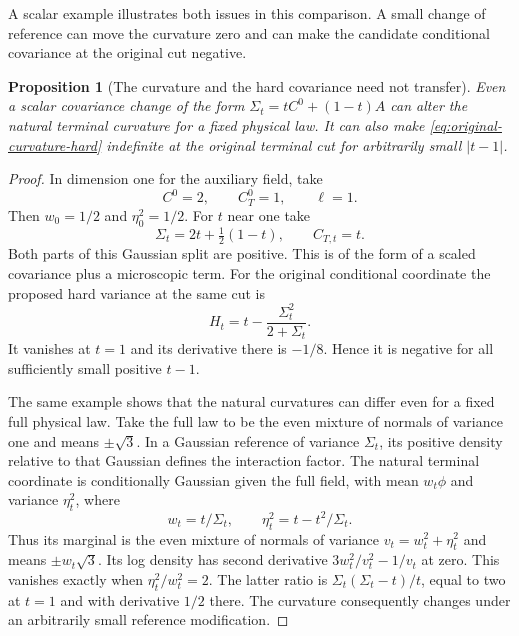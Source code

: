 \documentclass[11pt]{article}
\newtheorem{proposition}[theorem]{Proposition}
\theoremstyle{definition}
\begin{document}
A scalar example illustrates both issues in this comparison. A
small change of reference can move the curvature zero and can
make the candidate conditional covariance at the original cut
negative.

\begin{proposition}[The curvature and the hard covariance need not transfer]
\label{prop:curvature-reference-obstruction}
Even a scalar covariance change of the form
\(\Sigma_t=tC^0+(1-t)A\) can alter the natural terminal
curvature for a fixed physical law. It can also make
\eqref{eq:original-curvature-hard} indefinite at the original
terminal cut for arbitrarily small \(|t-1|\).
\end{proposition}

\begin{proof}
In dimension one for the auxiliary field, take
\begin{equation}
 C^0=2,\qquad C_T^0=1,\qquad \ell=1.
\end{equation}
Then \(w_0=1/2\) and \(\eta_0^2=1/2\). For \(t\) near one
take
\begin{equation}
 \Sigma_t=2t+\tfrac12(1-t),\qquad C_{T,t}=t .
\end{equation}
Both parts of this Gaussian split are positive. This is of
the form of a scaled covariance plus a microscopic term.
For the original conditional coordinate the proposed hard
variance at the same cut is
\begin{equation}
 H_t=t-\frac{\Sigma_t^2}{2+\Sigma_t}.
\end{equation}
It vanishes at \(t=1\) and its derivative there is
\(-1/8\). Hence it is negative for all sufficiently small
positive \(t-1\).

The same example shows that the natural curvatures can differ
even for a fixed full physical law. Take the full law to be
the even mixture of normals of variance one and means
\(\pm\sqrt3\). In a Gaussian reference of variance
\(\Sigma_t\), its positive density relative to that Gaussian
defines the interaction factor. The natural terminal
coordinate is conditionally Gaussian given the full field,
with mean \(w_t\phi\) and variance \(\eta_t^2\), where
\begin{equation}
 w_t=t/\Sigma_t,\qquad
 \eta_t^2=t-t^2/\Sigma_t.
\end{equation}
Thus its marginal is the even mixture of normals of
variance \(v_t=w_t^2+\eta_t^2\) and means
\(\pm w_t\sqrt3\). Its log density has second derivative
\(3w_t^2/v_t^2-1/v_t\) at zero. This vanishes exactly when
\(\eta_t^2/w_t^2=2\). The latter ratio is
\(\Sigma_t(\Sigma_t-t)/t\), equal to two at \(t=1\) and
with derivative \(1/2\) there. The curvature consequently
changes under an arbitrarily small reference modification.
\end{proof}
\end{document}

